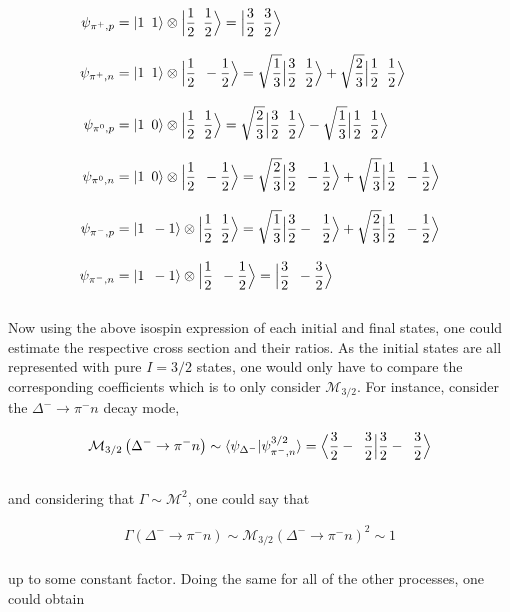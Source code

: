 \begin{solution}
\begin{align*}
    \psi_{\pi^+,p} &= \ket{1\hskip0.5em\relax 1} \otimes \Big| \frac{1}{2} \hskip0.5em\relax \frac{1}{2} \Big\rangle = \Big| \frac{3}{2} \hskip0.5em\relax \frac{3}{2} \Big\rangle \\[0.12in]
    \psi_{\pi^+,n} &= \ket{1\hskip0.5em\relax 1} \otimes \Big| \frac{1}{2} \hskip0.5em\relax -\frac{1}{2} \Big\rangle = \sqrt{\frac{1}{3}} \Big| \frac{3}{2} \hskip0.5em\relax \frac{1}{2} \Big\rangle + \sqrt{\frac{2}{3}} \Big| \frac{1}{2} \hskip0.5em\relax \frac{1}{2} \Big\rangle \\[0.12in]
    \psi_{\pi^0,p} &= \ket{1\hskip0.5em\relax 0} \otimes \Big| \frac{1}{2} \hskip0.5em\relax \frac{1}{2} \Big\rangle = \sqrt{\frac{2}{3}} \Big| \frac{3}{2} \hskip0.5em\relax \frac{1}{2} \Big\rangle - \sqrt{\frac{1}{3}} \Big| \frac{1}{2} \hskip0.5em\relax \frac{1}{2} \Big\rangle \\[0.12in]
    \psi_{\pi^0,n} &= \ket{1\hskip0.5em\relax 0} \otimes \Big| \frac{1}{2} \hskip0.5em\relax -\frac{1}{2} \Big\rangle = \sqrt{\frac{2}{3}} \Big| \frac{3}{2} \hskip0.5em\relax -\frac{1}{2} \Big\rangle + \sqrt{\frac{1}{3}} \Big| \frac{1}{2} \hskip0.5em\relax -\frac{1}{2} \Big\rangle \\[0.12in]
    \psi_{\pi^-,p} &= \ket{1\hskip0.5em\relax -1} \otimes \Big| \frac{1}{2} \hskip0.5em\relax \frac{1}{2} \Big\rangle = \sqrt{\frac{1}{3}} \Big| \frac{3}{2} -\hskip0.5em\relax \frac{1}{2} \Big\rangle + \sqrt{\frac{2}{3}} \Big| \frac{1}{2} \hskip0.5em\relax -\frac{1}{2} \Big\rangle \\[0.12in]
    \psi_{\pi^-,n} &= \ket{1\hskip0.5em\relax -1} \otimes \Big| \frac{1}{2} \hskip0.5em\relax -\frac{1}{2} \Big\rangle =   \Big| \frac{3}{2} \hskip0.5em\relax -\frac{3}{2} \Big\rangle 
\end{align*}\\
Now using the above isospin expression of each initial and final states, one could estimate the respective cross section and their ratios. As the initial states are all represented with pure $I=3/2$ states, one would only have to compare the corresponding coefficients which is to only consider $\mathcal{M}_{3/2}$. For instance, consider the $\Delta^- \to \pi^- n $ decay mode, 

\begin{align*}
    \mathcal{M}_{3/2} \left( \Delta^- \to \pi^- n \right) \sim \braket{\psi_{\Delta^-}  | \psi_{\pi^-,n}^{3/2}} =   \Big\langle \frac{3}{2} -\hskip0.5em\relax \frac{3}{2}  \Big| \frac{3}{2} -\hskip0.5em\relax \frac{3}{2} \Big\rangle  
\end{align*}\\
and considering that $\Gamma \sim \mathcal{M}^2$, one could say that 

\begin{align*}
    \Gamma\left( \Delta^- \to \pi^- n \right) \sim \mathcal{M}_{3/2} \left( \Delta^- \to \pi^- n \right)^2 \sim 1
\end{align*}\\
up to some constant factor. Doing the same for all of the other processes, one could obtain 


\end{solution}
